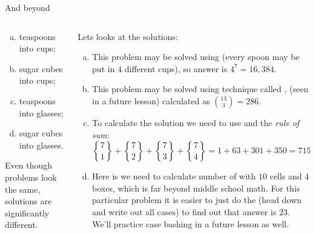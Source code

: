 \documentclass[9pt,aspectratio=169]{beamer}
\begin{document}
\begin{frame}{And beyond}
\begin{columns}[T]
\begin{column}{0.5\textwidth}
\begin{problem}
        \begin{enumerate}[a)]
          \item teaspoons into cups;
          \item sugar cubes into cups;
          \item teaspoons into glasses;
          \item sugar cubes into glasses.
        \end{enumerate}
      \end{problem}
      \begin{figure}\end{figure}
      Even though problems look the same, solutions are significantly different.
    \end{column}
    \begin{column}{0.5\textwidth}
      {\small
      Lets looks at the solutions:
      \begin{enumerate}[a)]
        \item This problem may be solved using  (every spoon may be put in $4$ different cups), so answer is $4^7 = 16,384$.
        \item This problem may be solved using technique called , (seen in a future lesson) calculated as $\binom{13}{3} = 286$.
        \item To calculate the solution we need to use  and the \emph{rule of sum}:
        \[ {7\brace 1}+{7\brace 2}+{7\brace 3}+{7\brace 4}=1+63+301+350=715. \]\vspace*{-1ex}
        \item Here is we need to calculate number of  with $10$ cells and $4$ boxes, which is far beyond middle school math. For this particular problem it is easier to just do the  (head down and write out all cases) to find out that answer is $23$.  We’ll practice case bashing in a future lesson as well.
      \end{enumerate}
      }
    \end{column}
  \end{columns}
\end{frame}
\end{document}
